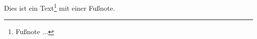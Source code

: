 \documentclass{scrartcl}
\begin{document}
Dies ist ein Text\footnote{Fußnote ...} mit einer Fußnote.
\end{document}
